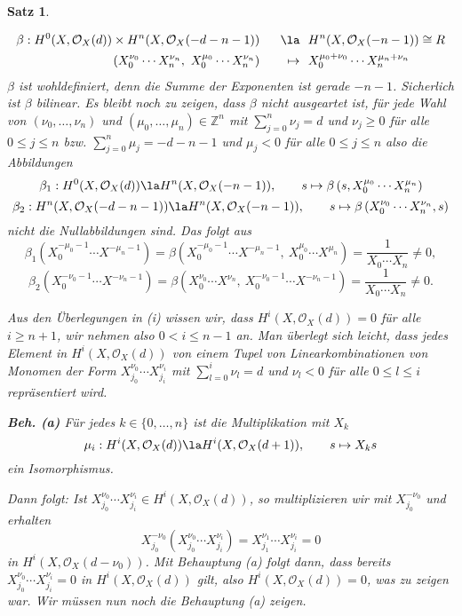 \documentclass[11pt]{book}
\newtheorem{theorem}{Satz}[section]
\theoremstyle{nonumberbreak}
\newenvironment{pr}[1][]{\ifthenelse{\equal{#1}{}}{\proof}{\proof[#1]}\rm}{\endproof}
\begin{document}
\begin{spacing}{1.4}
\begin{theorem}
\begin{pr}
\begin{compactenum}
\setlength{\abovedisplayskip}{5.5pt}
\setlength{\belowdisplayskip}{5.5pt}
\begin{alignat*}{5}
\beta:H^{0}(X, \mathcal{O}_X(d)) \times H^{n}(X, \mathcal{O}_X(-d-n-1)) \ \ && \la& \ \ H^{n}(X, \mathcal{O}_X(-n-1)) \cong R \\
\left(X_0^{\nu_0} \cdots X_n^{\nu_n}, \ X_0^{\mu_0} \cdots X_n^{\nu_n} \right)\ \  && \mapsto  & \ \ X_0^{\mu_0 + \nu_0} \cdots X_n^{\mu_n + \nu_n} 
\end{alignat*}
$\beta$ ist wohldefiniert, denn die Summe der Exponenten ist gerade $-n-1$. Sicherlich ist $\beta$ bilinear. Es bleibt noch zu zeigen, dass $\beta$ nicht ausgeartet ist, für jede Wahl von $(\nu_0, \ldots, \nu_n)$ und $(\mu_0, \ldots, \mu_n) \in \mathbb{Z}^n$ mit $\sum_{j=0}^n \nu_j =d$ und $\nu_j \geqslant 0$ für alle $0 \leqslant j \leqslant n$ bzw. $\sum_{j=0}^n \mu_j = -d-n-1$ und $\mu_j <0$ für alle $0 \leqslant j \leqslant n$ also die Abbildungen 
$$\beta_1: H^{0}(X, \mathcal{O}_X(d)) \la H^{n}(X, \mathcal{O}_X(-n-1)), \qquad s \mapsto \beta\left(s, X_0^{\mu_0} \cdots X_n^{\mu_n} \right)$$
$$\beta_2: H^{n}(X, \mathcal{O}_X(-d-n-1)) \la H^{n}(X, \mathcal{O}_X(-n-1)), \qquad s \mapsto \beta\left(X_0^{\nu_0} \cdots X_n^{\nu_n}, s \right)$$
nicht die Nullabbildungen sind. Das folgt aus 
$$\beta_1\left(X_0^{-\mu_0-1} \cdots X^{-\mu_n-1} \right) = \beta\left(X_0^{-\mu_0-1} \cdots X^{-\mu_n-1},\ X_0^{\mu_0} \cdots X^{\mu_n} \right) = \frac{1}{X_0 \cdots X_n} \neq 0,$$
$$\beta_2\left(X_0^{-\nu_0-1} \cdots X^{-\nu_n-1} \right) = \beta\left( X_0^{\nu_0} \cdots X^{\nu_n},\ X_0^{-\nu_0-1} \cdots X^{-\nu_n-1} \right) = \frac{1}{X_0 \cdots X_n} \neq 0.$$


\item Aus den Überlegungen in (i) wissen wir, dass $H^{i}(X, \mathcal{O}_X(d)) = 0$ für alle $i \geqslant n+1$, wir nehmen also $0 < i \leqslant n-1$ an. Man überlegt sich leicht, dass jedes Element in $H^{i}(X, \mathcal{O}_X(d))$ von einem Tupel von Linearkombinationen von Monomen der Form 
$X_{j_0}^{\nu_0} \cdots X_{j_i}^{\nu_i}$ mit $ \sum_{l=0}^{i} \nu_l = d$ und $\nu_l <0$ für alle $0 \leqslant l \leqslant i$
repräsentiert wird.
\begin{compactenum}
\item[\textbf{Beh. (a)}] Für jedes $k \in \{0, \ldots, n \}$ ist die Multiplikation mit $X_k$
$$\mu_i: H^{i}(X, \mathcal{O}_X(d)) \la H^{i}(X, \mathcal{O}_X(d+1)), \qquad s \mapsto X_k s$$
ein Isomorphismus.
\end{compactenum}
Dann folgt: Ist $X_{j_0}^{\nu_0} \cdots X_{j_i}^{\nu_i} \in H^{i}(X, \mathcal{O}_X(d))$, so multiplizieren wir mit $X_{j_0}^{-\nu_0}$ und erhalten 
$$X_{j_0}^{-\nu_0} \left( X_{j_0}^{\nu_0} \cdots X_{j_i}^{\nu_i} \right) = X_{j_1}^{\nu_1} \cdots X_{j_i}^{\nu_i} = 0$$
in $H^{i}(X, \mathcal{O}_X(d-\nu_0))$. Mit Behauptung (a) folgt dann, dass bereits $X_{j_0}^{\nu_0} \cdots X_{j_i}^{\nu_i}=0$ in $H^{i}(X, \mathcal{O}_X(d))$ gilt, also $H^{i}(X, \mathcal{O}_X(d))=0$, was zu zeigen war. Wir müssen nun noch die Behauptung (a) zeigen.


\end{compactenum}
\end{pr}
\end{theorem}
\end{spacing}
\end{document}
